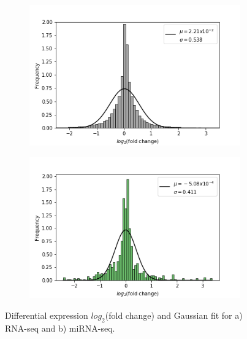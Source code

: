\begin{figure}
     \centering
     \begin{subfigure}[b]{0.49\textwidth}
         \centering
         \includegraphics[width=\textwidth]{img/rnaDE.png}
         \caption{}
     \end{subfigure}
     \hfill
     \begin{subfigure}[b]{0.49\textwidth}
         \centering
         \includegraphics[width=\textwidth]{img/mirnaDE.png}
         \caption{}
     \end{subfigure}
        \caption{Differential expression $log_2$(fold change) and Gaussian fit for a) RNA-seq and b) miRNA-seq.}
        \label{fig:deHist}
\end{figure}
